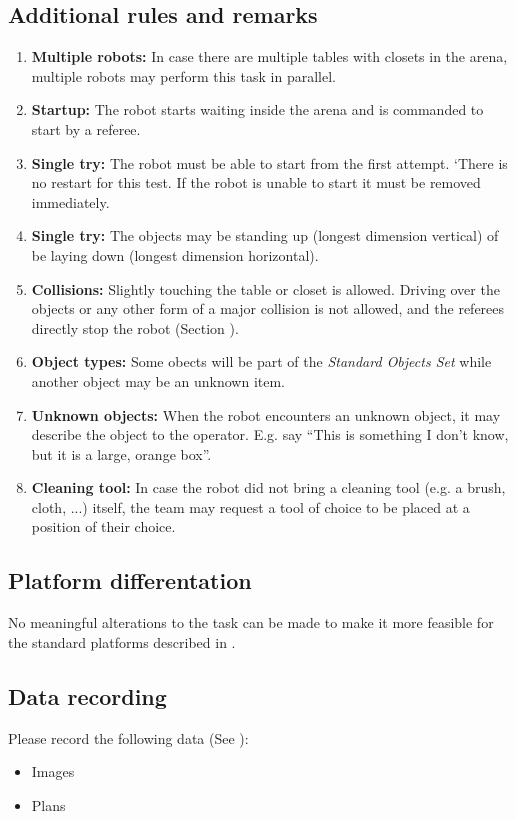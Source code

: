 \subsection{Additional rules and remarks}
\begin{enumerate}
\item \textbf{Multiple robots:} In case there are multiple tables with closets in the arena, multiple robots may perform this task in parallel. 
\item \textbf{Startup:} The robot starts waiting inside the arena and is commanded to start by a referee. 
\item \textbf{Single try:} The robot must be able to start from the first attempt. 
`There is no restart for this test. If the robot is unable to start it must be removed immediately.
\item \textbf{Single try:} The objects may be standing up (longest dimension vertical) of be laying down (longest dimension horizontal). 
\item \textbf{Collisions:} Slightly touching the table or closet is allowed. 
  Driving over the objects or any other form of a major collision is not allowed, and the referees directly stop the robot (Section ).
\item \textbf{Object types:} Some obects will be part of the \textit{Standard Objects Set} while another object may be an unknown item.
\item \textbf{Unknown objects:} When the robot encounters an unknown object, it may describe the object to the operator. E.g. say ``This is something I don't know, but it is a large, orange box''.
\item \textbf{Cleaning tool:} In case the robot did not bring a cleaning tool (e.g. a brush, cloth,  ...) itself, 
  the team may request a tool of choice to be placed at a position of their choice. 
\end{enumerate}

\subsection{Platform differentation}
No meaningful alterations to the task can be made to make it more feasible for the standard platforms described in . 

\subsection{Data recording}
  Please record the following data (See ):
  \begin{itemize}
   \item Images
   \item Plans
  \end{itemize}

